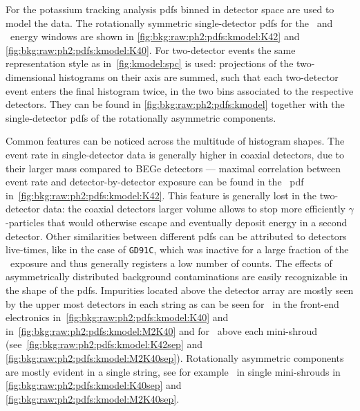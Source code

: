 For the potassium tracking analysis pdfs binned in detector space are
used to model the data. The rotationally symmetric single-detector pdfs
for the \kvn\ and \kvz\ energy windows are shown in
\cref{fig:bkg:raw:ph2:pdfs:kmodel:K42} and
\cref{fig:bkg:raw:ph2:pdfs:kmodel:K40}.  For two-detector events the
same representation style as in~\cref{fig:kmodel:spc} is used:
projections of the two-dimensional histograms on their axis are summed,
such that each two-detector event enters the final histogram twice, in
the two bins associated to the respective detectors. They can be found
in \cref{fig:bkg:raw:ph2:pdfs:kmodel} together with the single-detector
pdfs of the rotationally asymmetric components. 

Common features can be noticed across the multitude of histogram shapes.
The event rate in single-detector data is generally higher in coaxial
detectors, due to their larger mass compared to BEGe detectors ---
maximal correlation between event rate and detector-by-detector exposure
can be found in the \nnbb\ pdf in~\cref{fig:bkg:raw:ph2:pdfs:kmodel:K42}. This
feature is generally lost in the two-detector data: the coaxial
detectors larger volume allows to stop more efficiently
$\gamma$-particles that would otherwise escape and eventually deposit
energy in a second detector. Other similarities between different pdfs
can be attributed to detectors live-times, like in the case of
\texttt{GD91C}, which was inactive for a large fraction of the
\phasetwo\ exposure and thus generally registers a low number of counts.
The effects of asymmetrically distributed background contaminations are
easily recognizable in the shape of the pdfs.  Impurities located above
the detector array are mostly seen by the upper most detectors in each
string as can be seen for \kvn\ in the front-end electronics
in~\cref{fig:bkg:raw:ph2:pdfs:kmodel:K40} and
in~\cref{fig:bkg:raw:ph2:pdfs:kmodel:M2K40} and for \kvz\ above each
mini-shroud (see~\cref{fig:bkg:raw:ph2:pdfs:kmodel:K42sep} and
\cref{fig:bkg:raw:ph2:pdfs:kmodel:M2K40sep}). Rotationally asymmetric
components are mostly evident in a single string, see for example \kvn\
in single mini-shrouds in \cref{fig:bkg:raw:ph2:pdfs:kmodel:K40sep} and
\cref{fig:bkg:raw:ph2:pdfs:kmodel:M2K40sep}.

